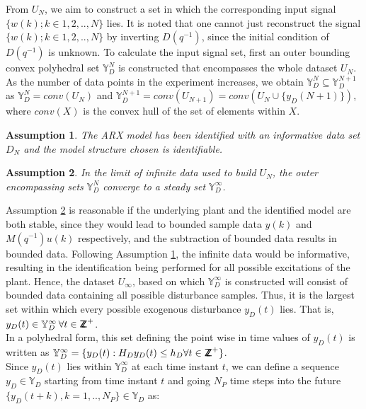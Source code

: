 \documentclass[letterpaper, 10 pt, conference]{ieeeconf}  %
\newcommand*{\ZZ}{%
	\textsf{Z\kern-1ex Z}%
}
\newtheorem{assumption}{Assumption}
\begin{document}
    From $U_N$, we aim to construct a set in which the corresponding input signal $\{w(k);k \in 1,2,..,N\}$ lies. It is noted that one cannot just reconstruct the signal $\{w(k);k \in 1,2,..,N\}$ by inverting $D(q^{-1})$, since the initial condition of $D(q^{-1})$ is unknown.
    To calculate the input signal set,
 first an outer bounding convex polyhedral set $\mathbb{Y}_D^N$ is constructed that encompasses the whole dataset $U_N$. As the number of data points in the experiment increases, we obtain $\mathbb{Y}_D^{N} \subseteq \mathbb{Y}_D^{N+1}$ as
 $\mathbb{Y}_D^{N} = conv(U_N)$ and  $\mathbb{Y}_D^{N+1} = conv(U_{N+1})=conv(U_{N} \cup \{y_D(N+1)\} )$, where $conv(X)$ is the convex hull of the set of elements within $X$. 
  \begin{assumption}
  	The ARX model has been identified with an informative data set $D_N$ and the model structure chosen is identifiable.
  	\label{assmp_arx}
  \end{assumption} 
 \begin{assumption}
 	 In the limit of infinite data used to build $U_N$, the outer encompassing sets $\mathbb{Y}_D^{N}$ converge to a steady set $\mathbb{Y}_D^{\infty}$.
 	 \label{assmp_inf}
 \end{assumption} 
  Assumption \ref{assmp_inf} is reasonable if the underlying plant and the identified model are both stable, since they would lead to bounded sample data $y(k)$ and $M(q^{-1})u(k)$ respectively, and the subtraction of bounded data results in bounded data. Following Assumption \ref{assmp_arx}, the infinite data would be informative, resulting in the identification being performed for all possible excitations of the plant.  Hence, the dataset $U_{\infty}$, based on which $\mathbb{Y}_D^{\infty}$ is constructed will consist of bounded data containing all possible disturbance samples. Thus, it is the largest set within which every possible exogenous disturbance $y_D(t)$ lies. That is, $y_D(t) \in \mathbb{Y}_D^{\infty} \hspace{2pt}  \forall t \in \ZZ^{+}$. \\
\noindent
In a polyhedral form, this set defining the point wise in time values of $y_D(t)$ is written as $\mathbb{Y}_D^{\infty} = \{y_D(t):H_Dy_D(t) \leq h_D \forall t \in \ZZ^+\}$. \\
 Since $y_D(t)$ lies within $\mathbb{Y}_D^{\infty}$ at each time instant $t$, we can define a sequence $y_D \in \mathbb{Y}_D$ starting from time instant $t$ and going $N_P$ time steps into the future $\{y_D(t+k),k=1,..,N_P\}\in\mathbb{Y}_D$ as:
\end{document}
